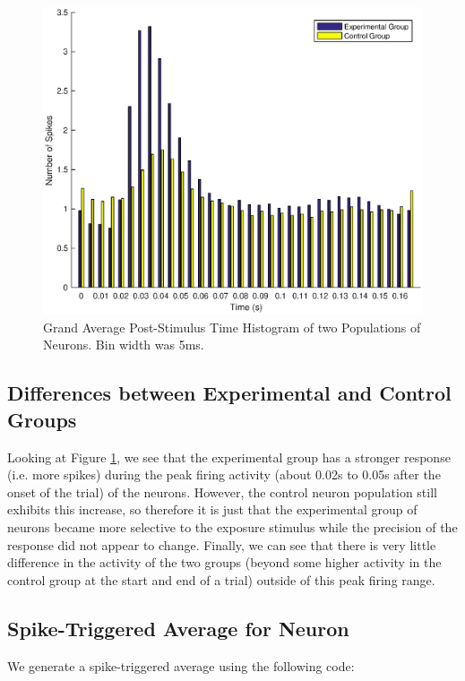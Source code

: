 \documentclass[11pt, oneside]{article}
\begin{document}
\begin{figure}[ht!]
\includegraphics[width=1\textwidth]{Q1PD.eps}
\caption{Grand Average Post-Stimulus Time Histogram of two Populations of Neurons. Bin width was 5ms.}
\label{fig:PSTH}
\end{figure}

\subsection{Differences between Experimental and Control Groups}

Looking at Figure \ref{fig:PSTH}, we see that the experimental group has a stronger response (i.e. more spikes)
during the peak firing activity (about 0.02s to 0.05s after the onset of the trial) of the neurons. However, the control neuron population still exhibits this increase, so therefore it is just that the experimental group of neurons became more selective to the exposure stimulus while the precision of the response did not appear to change. Finally, we can see that there is very little difference in the activity of the two groups (beyond some higher activity in the control group at the start and end of a trial) outside of this peak firing range.

\subsection{Spike-Triggered Average for Neuron}

We generate a spike-triggered average using the following code:

\end{document}
